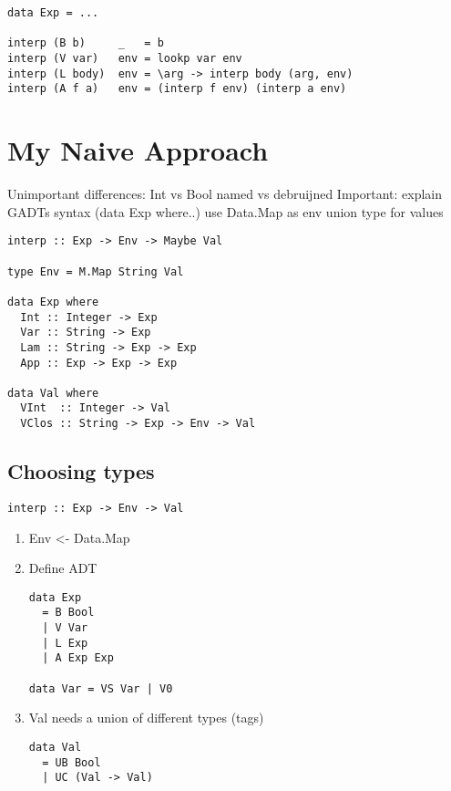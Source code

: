 \documentclass[11pt]{article}
\begin{document}
\begin{verbatim}
data Exp = ...

interp (B b)     _   = b
interp (V var)   env = lookp var env
interp (L body)  env = \arg -> interp body (arg, env)
interp (A f a)   env = (interp f env) (interp a env)
\end{verbatim}


\section*{My Naive Approach}
\label{sec:org3ffa93b}

\begin{NOTES}
Unimportant differences:
  Int vs Bool
  named vs debruijned
Important:
  explain GADTs syntax (data Exp where..)
  use Data.Map as env
  union type for values
\end{NOTES}

\begin{verbatim}
interp :: Exp -> Env -> Maybe Val

type Env = M.Map String Val

data Exp where
  Int :: Integer -> Exp
  Var :: String -> Exp
  Lam :: String -> Exp -> Exp
  App :: Exp -> Exp -> Exp

data Val where
  VInt  :: Integer -> Val
  VClos :: String -> Exp -> Env -> Val
\end{verbatim}

\subsection*{Choosing types}
\label{sec:orge970b6c}

\begin{verbatim}
interp :: Exp -> Env -> Val
\end{verbatim}

\begin{enumerate}
\item Env <- Data.Map

\item Define ADT
\begin{verbatim}
data Exp
  = B Bool
  | V Var
  | L Exp
  | A Exp Exp

data Var = VS Var | V0
\end{verbatim}

\item Val needs a union of different types (tags)
\begin{verbatim}
data Val
  = UB Bool
  | UC (Val -> Val)
\end{verbatim}
\end{enumerate}
\end{document}
